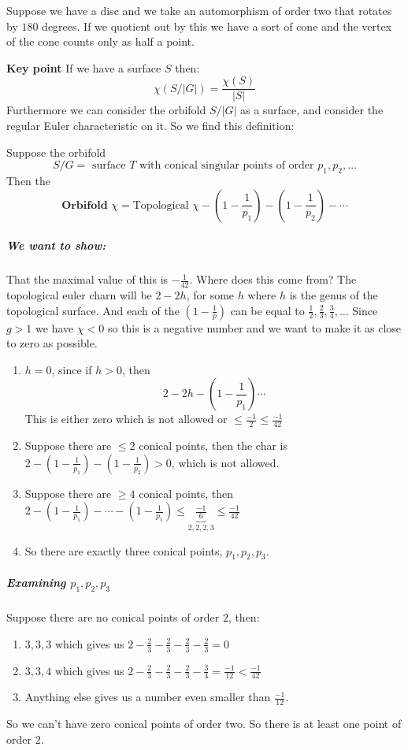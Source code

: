 \begin{example}
    Suppose we have a disc and we take an automorphism of order two that rotates by $180$ degrees. If we quotient out by this we have a sort of cone and the vertex of the cone counts only as half a point. 
\end{example}

\begin{remark}\textbf{Key point}
If we have a surface $S$ then:\[\chi(S/|G|) = \frac{\chi(S)}{|S|}\]
Furthermore we can consider the orbifold $S/|G|$ as a surface, and consider the regular Euler characteristic on it. So we find this definition:
\begin{definition}
    Suppose the orbifold \[S/G = \text{ surface }T\text{ with conical singular points of order }p_1,p_2,\ldots\]
    Then the \[\textbf{Orbifold }\chi = \text{Topological }\chi - (1-\frac{1}{p_1})-(1-\frac{1}{p_2})-\cdots\]
\end{definition}
\end{remark}

\subparagraph*{We want to show:} 
That the maximal value of this is $-\frac{1}{42}$. Where does this come from? The topological euler charn will be $2-2h$, for some $h$ where $h$ is the genus of the topological surface. And each of the $(1-\frac{1}{p})$ can be equal to $\frac{1}{2}, \frac{2}{3}, \frac{3}{4}, \ldots$
Since $g>1$ we have $\chi<0$ so this is a negative number and we want to make it as close to zero as possible.
\begin{enumerate}
    \item $h=0$, since if $h>0$, then \[2-2h - (1-\frac{1}{p_1})\cdots\] This is either zero which is not allowed or $\leq \frac{-1}{2}\leq \frac{-1}{42}$
    \item Suppose there are $\leq 2$ conical points, then the char is $2 - (1-\frac{1}{p_1}) - (1-\frac{1}{p_2}) > 0$, which is not allowed.
    \item Suppose there are $\geq 4$ conical points, then $2 - (1-\frac{1}{p_1})-\cdots -(1-\frac{1}{p_1}) \leq \underbrace{\frac{-1}{6}}_{2,2,2,3}\leq \frac{-1}{42}$
    \item So there are exactly three conical points, $p_1,p_2,p_3$.
\end{enumerate}
\subparagraph*{Examining $p_1,p_2,p_3$}

Suppose there are no conical points of order $2$, then:\begin{enumerate}
    \item $3,3,3$ which gives us $2-\frac{2}{3}-\frac{2}{3}-\frac{2}{3}-\frac{2}{3} = 0$
    \item $3,3,4$ which gives us $2-\frac{2}{3}-\frac{2}{3}-\frac{2}{3}-\frac{3}{4} = \frac{-1}{12}<\frac{-1}{42}$
    \item Anything else gives us a number even smaller than $\frac{-1}{12}$.
\end{enumerate}
So we can't have zero conical points of order two. So there is at least one point of order $2$. 

